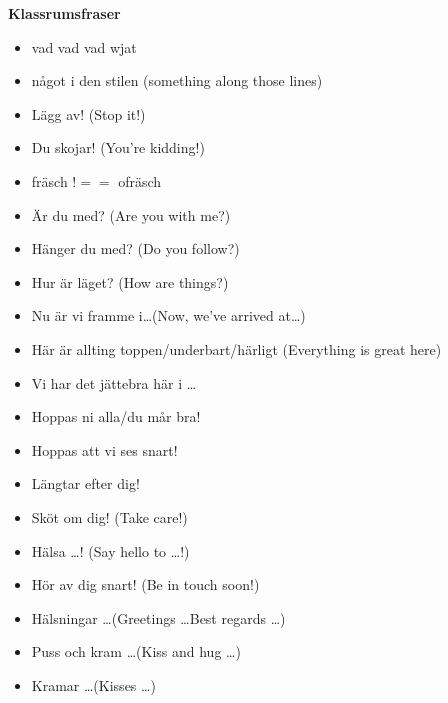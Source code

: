 
\begin{flushleft}
    \textbf{Klassrumsfraser}
    \begin{itemize}
        \item vad vad vad wjat
        \item något i den stilen (something along those lines)
        \item Lägg av! (Stop it!)
        \item Du skojar! (You're kidding!)
        \item fräsch $!==$ ofräsch
        \item Är du med? (Are you with me?)
        \item Hänger du med? (Do you follow?)
        \item Hur är läget? (How are things?)
        \item Nu är vi framme i\ldots (Now, we've arrived at\ldots)
        \item Här är allting toppen/underbart/härligt (Everything is great
        here)
        \item Vi har det jättebra här i \ldots
        \item Hoppas ni alla/du mår bra!
        \item Hoppas att vi ses snart!
        \item Längtar efter dig!
        \item Sköt om dig! (Take care!)
        \item Hälsa \ldots! (Say hello to \ldots!)
        \item Hör av dig snart! (Be in touch soon!)
        \item Hälsningar \ldots (Greetings \ldots Best regards \ldots)
        \item Puss och kram \ldots (Kiss and hug \ldots)
        \item Kramar \ldots (Kisses \ldots)
    \end{itemize}
\end{flushleft}

